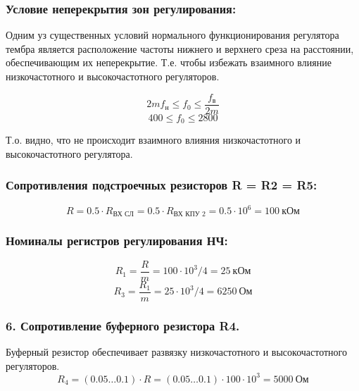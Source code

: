 
\subsubsection{Условие неперекрытия зон регулирования:} %
Одним уз существенных условий нормального функционирования регулятора тембра является расположение частоты нижнего и верхнего среза на расстоянии, обеспечивающим их неперекрытие. Т.е. чтобы избежать взаимного влияние низкочастотного и высокочастотного регуляторов. \par

  \begin{equation}
    \label{eq:equation5_3}
      2 m f_{\text{н}} \leq f_0 \leq \dfrac{f_{\text{в}}}{2m} 
 \end{equation} 
 \begin{equation}
   \label{eq:equation5_4}
     400 \leq f_0 \leq 2800
  \end{equation} 

    Т.о. видно, что не происходит взаимного влияния низкочастотного и высокочастотного регулятора.


\subsubsection{Сопротивления подстроечных резисторов R = R2 = R5:}
\begin{equation}
   \label{eq:equation5_5}
R=0.5 \cdot R_{\text{ВХ СЛ}}=0.5 \cdot R_{\text{ВХ КПУ 2}}=0.5 \cdot  10^6=100~\text{кОм}
\end{equation} 

\subsubsection{ Номиналы регистров регулирования НЧ:}
\begin{equation}
   \label{eq:equation5_6}
   R_1=\dfrac{R}{m}=100 \cdot 10^3 /4 =25~\text{кОм}
   \end{equation} 
   \begin{equation}
   \label{eq:equation5_7}
   R_3=\dfrac {R_1}{m}=25 \cdot 10^3/4=6250~\text{Ом}
   \end{equation} 
   \subsubsection{ 6. Сопротивление буферного  резистора R4.}
   Буферный резистор обеспечивает развязку  низкочастотного и высокочастотного регуляторов. 
   \begin{equation}
   \label{eq:equation5_8}
   R_4=(0.05 \ldots 0.1) \cdot R=(0.05 \ldots 0.1) \cdot 100 \cdot 10^3 = 5000~\text{Ом}
   \end{equation} 
